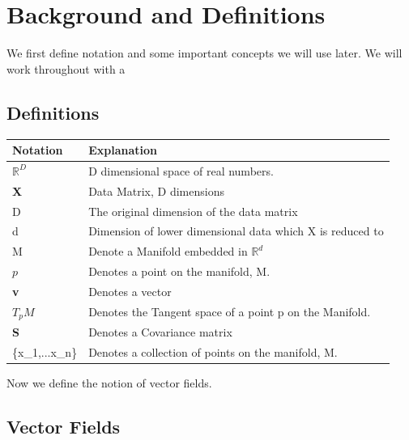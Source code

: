 \documentclass[12pt]{report}
\begin{document}
\section{Background and Definitions}

We first define notation and some important concepts we will use later.
We will work throughout with a 

\newpage

\subsection{Definitions}

\begin{table}[]
\begin{tabular}{|l|l|}
\hline
\textbf{Notation} & \textbf{Explanation}                                      \\ \hline
$\mathbb{R}^D$    & D dimensional space of real numbers.                      \\ \hline
\textbf{X}        & Data Matrix, D dimensions                                 \\ \hline
D                 & The original dimension of the data matrix                 \\ \hline
d                 & Dimension of lower dimensional data which X is reduced to \\ \hline
M                 & Denote a Manifold embedded in $\mathbb{R}^d$              \\ \hline
$p$               & Denotes a point on the manifold, M.                       \\ \hline
\textbf{v}        & Denotes a vector                                          \\ \hline
$T_pM$            & Denotes the Tangent space of a point p on the Manifold.   \\ \hline
\textbf{S}        & Denotes a Covariance matrix                               \\ \hline
\{x\_1,...x\_n\}  & Denotes a collection of points on the manifold, M.        \\ \hline
\end{tabular}
\end{table}

Now we define the notion of vector fields.

\subsection{Vector Fields}
\end{document}
